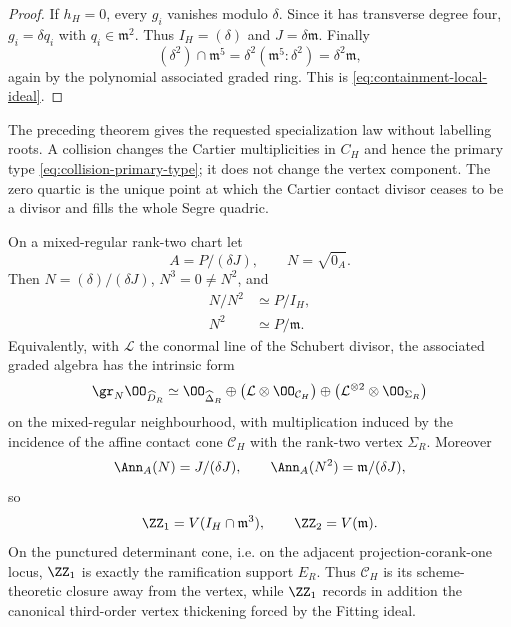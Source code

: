 \begin{proof}
If \(h_H=0\), every \(g_i\) vanishes modulo \(\delta\).  Since it has
transverse degree four, \(g_i=\delta q_i\) with
\(q_i\in\mathfrak m^2\).  Thus \(I_H=(\delta)\) and
\(J=\delta\mathfrak m\).  Finally
\[
 (\delta^2)\cap\mathfrak m^5
 =\delta^2(\mathfrak m^5:\delta^2)
 =\delta^2\mathfrak m,
\]
again by the polynomial associated graded ring.  This is
\eqref{eq:containment-local-ideal}.
\end{proof}

The preceding theorem gives the requested specialization law without
labelling roots.  A collision changes the Cartier multiplicities in
\(C_H\) and hence the primary type
\eqref{eq:collision-primary-type}; it does not change the vertex
component.  The zero quartic is the unique point at which the Cartier
contact divisor ceases to be a divisor and fills the whole Segre
quadric.

\begin{theorem}\label{thm:graded-nilpotent}
On a mixed-regular rank-two chart let
\[
 A=P/(\delta J),\qquad N=\sqrt{0_A}.
\]
Then \(N=(\delta)/(\delta J)\), \(N^3=0\ne N^2\), and
\begin{align}
 N/N^2&\simeq P/I_H, \label{eq:grade-one-contact}\\
 N^2&\simeq P/\mathfrak m. \label{eq:grade-two-vertex}
\end{align}
Equivalently, with \(\mathcal L\) the conormal line of the Schubert
divisor, the associated graded algebra has the intrinsic form
\begin{equation}\label{eq:global-associated-graded}
 \gr_N\OO_{\widehat D_R}
 \simeq
 \OO_{\widehat\Delta_R}
 \oplus
 \bigl(\mathcal L\otimes\OO_{\mathcal C_H}\bigr)
 \oplus
 \bigl(\mathcal L^{\otimes2}\otimes\OO_{\Sigma_R}\bigr)
\end{equation}
on the mixed-regular neighbourhood, with multiplication induced by
the incidence of the affine contact cone \(\mathcal C_H\) with the
rank-two vertex \(\Sigma_R\).
Moreover
\begin{equation}\label{eq:Z1Z2-exact}
 \Ann_A(N)=J/(\delta J),\qquad
 \Ann_A(N^2)=\mathfrak m/(\delta J),
\end{equation}
so
\[
 \ZZ_1=V(I_H\cap\mathfrak m^3),\qquad
 \ZZ_2=V(\mathfrak m).
\]
On the punctured determinant cone, i.e. on the adjacent
projection-corank-one locus, \(\ZZ_1\) is exactly the ramification
support \(E_R\).  Thus \(\mathcal C_H\) is its scheme-theoretic closure away
from the vertex, while \(\ZZ_1\) records in addition the canonical
third-order vertex thickening forced by the Fitting ideal.
\end{theorem}

